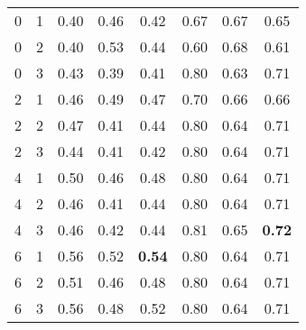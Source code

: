 \begin{table}[htb]
{\begin{tabular}{cc|ccc|ccc}
0 & 1 & 0.40 & 0.46 & 0.42 & 0.67 & 0.67 & 0.65 \\
0 & 2 & 0.40 & 0.53 & 0.44 & 0.60 & 0.68 & 0.61 \\
0 & 3 & 0.43 & 0.39 & 0.41 & 0.80 & 0.63 & 0.71 \\ \hline
2 & 1 & 0.46 & 0.49 & 0.47 & 0.70 & 0.66 & 0.66 \\
2 & 2 & 0.47 & 0.41 & 0.44 & 0.80 & 0.64 & 0.71 \\
2 & 3 & 0.44 & 0.41 & 0.42 & 0.80 & 0.64 & 0.71 \\ \hline
4 & 1 & 0.50 & 0.46 & 0.48 & 0.80 & 0.64 & 0.71 \\
4 & 2 & 0.46 & 0.41 & 0.44 & 0.80 & 0.64 & 0.71 \\
4 & 3 & 0.46 & 0.42 & 0.44 & 0.81 & 0.65 & \textbf{0.72} \\ \hline
6 & 1 & 0.56 & 0.52 & \textbf{0.54} & 0.80 & 0.64 & 0.71 \\
6 & 2 & 0.51 & 0.46 & 0.48 & 0.80 & 0.64 & 0.71 \\
6 & 3 & 0.56 & 0.48 & 0.52 & 0.80 & 0.64 & 0.71 \\
\end{tabular}
} \\
{}
\end{table}
